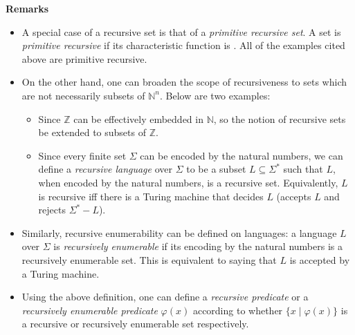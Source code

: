 \documentclass[12pt]{article}
\begin{document}
\textbf{Remarks}
\begin{itemize}
\item A special case of a recursive set is that of a \emph{primitive recursive set}.  A set is \emph{primitive recursive} if its characteristic function is .  All of the examples cited above are primitive recursive.
\item On the other hand, one can broaden the scope of recursiveness to sets which are not necessarily subsets of $\mathbb{N}^n$.  Below are two examples:
\begin{itemize}
\item Since $\mathbb{Z}$ can be effectively embedded in $\mathbb{N}$, so the notion of recursive sets be extended to subsets of $\mathbb{Z}$.
\item Since every finite set $\Sigma$ can be encoded by the natural numbers, we can define a \emph{recursive language} over $\Sigma$ to be a subset $L\subseteq \Sigma^*$ such that $L$, when encoded by the natural numbers, is a recursive set.  Equivalently, $L$ is recursive iff there is a Turing machine that decides $L$ (accepts $L$ and rejects $\Sigma^*-L$).
\end{itemize}
\item Similarly, recursive enumerability can be defined on languages: a language $L$ over $\Sigma$ is \emph{recursively enumerable} if its encoding by the natural numbers is a recursively enumerable set.  This is equivalent to saying that $L$ is accepted by a Turing machine.
\item Using the above definition, one can define a \emph{recursive predicate} or a \emph{recursively enumerable predicate} $\varphi(x)$ according to whether $\lbrace x\mid \varphi(x)\rbrace$ is a recursive or recursively enumerable set respectively.
\end{itemize}
\end{document}
